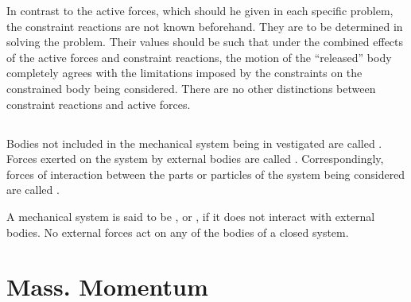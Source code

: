 In contrast to the active forces, which should he given in each specific problem, the constraint reactions are not known before­hand. They are to be determined in solving the problem. Their values should be such that under the combined effects of the active forces and constraint reactions, the motion of the ``re­leased'' body completely agrees with the limitations imposed by the constraints on the constrained body being considered. There are no other distinctions between constraint reactions and active forces.

\subsection{}\label{2.2.4} Bodies not included in the mechanical system being in­ vestigated are called . Forces exerted on the system by external bodies are called . Correspondingly, forces of interaction between the parts or particles of the system being considered are called .

A mechanical system is said to be , or , if it does not interact with external bodies. No external forces act on any of the bodies of a closed system.

\section{Mass. Momentum}
\label{sec-2.3}

